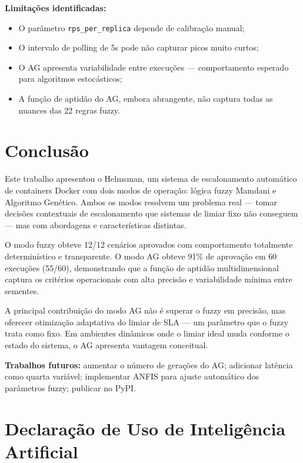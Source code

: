 \documentclass[12pt, a4paper]{article}
\begin{document}
\textbf{Limitações identificadas:}
\begin{itemize}
  \item O parâmetro \texttt{rps\_per\_replica} depende de calibração manual;
  \item O intervalo de polling de 5s pode não capturar picos muito curtos;
  \item O AG apresenta variabilidade entre execuções — comportamento esperado para algoritmos estocásticos;
  \item A função de aptidão do AG, embora abrangente, não captura todas as nuances das 22 regras fuzzy.
\end{itemize}

\section{Conclusão}

Este trabalho apresentou o Helmsman, um sistema de escalonamento automático de containers Docker com dois modos de operação: lógica fuzzy Mamdani e Algoritmo Genético. Ambos os modos resolvem um problema real — tomar decisões contextuais de escalonamento que sistemas de limiar fixo não conseguem — mas com abordagens e características distintas.

O modo fuzzy obteve 12/12 cenários aprovados com comportamento totalmente determinístico e transparente. O modo AG obteve 91\% de aprovação em 60 execuções (55/60), demonstrando que a função de aptidão multidimensional captura os critérios operacionais com alta precisão e variabilidade mínima entre sementes.

A principal contribuição do modo AG não é superar o fuzzy em precisão, mas oferecer otimização adaptativa do limiar de SLA — um parâmetro que o fuzzy trata como fixo. Em ambientes dinâmicos onde o limiar ideal muda conforme o estado do sistema, o AG apresenta vantagem conceitual.

\textbf{Trabalhos futuros:} aumentar o número de gerações do AG; adicionar latência como quarta variável; implementar ANFIS para ajuste automático dos parâmetros fuzzy; publicar no PyPI.

\section*{Declaração de Uso de Inteligência Artificial}
\end{document}

